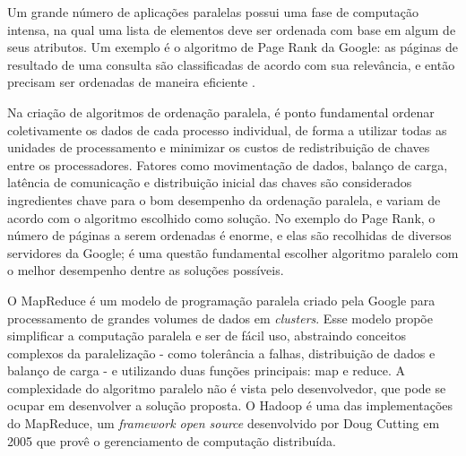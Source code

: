 

Um grande número de aplicações paralelas possui uma fase de computação intensa, na qual uma lista de elementos deve ser ordenada com base em algum de seus atributos. Um exemplo é o algoritmo de Page Rank \cite{PageRank:1999} da Google: as páginas de resultado de uma consulta são classificadas de acordo com sua relevância, e então precisam ser ordenadas de maneira eficiente \cite{Kale:2010}.

Na criação de algoritmos de ordenação paralela, é ponto fundamental ordenar coletivamente os dados de cada processo individual, de forma a utilizar todas as unidades de processamento e minimizar os custos de redistribuição de chaves entre os processadores. Fatores como movimentação de dados, balanço de carga, latência de comunicação e distribuição inicial das chaves são considerados ingredientes chave para o bom desempenho da ordenação paralela, e variam de acordo com o algoritmo escolhido como solução\cite{Kale:2010}. 
No exemplo do Page Rank, o número de páginas a serem ordenadas é enorme, e elas são recolhidas de diversos servidores da Google; é uma questão fundamental escolher algoritmo paralelo com o melhor desempenho dentre as soluções possíveis.


O MapReduce\cite{Dean:2008}  é um modelo de programação paralela criado pela Google para processamento de grandes volumes de dados em \textit{clusters}. Esse modelo propõe simplificar a computação paralela e ser de fácil uso, abstraindo conceitos complexos da paralelização - como tolerância a falhas, distribuição de dados e balanço de carga - e utilizando duas funções principais: map e reduce. A complexidade do algoritmo paralelo não é vista pelo desenvolvedor, que pode se ocupar em desenvolver a solução proposta. O Hadoop \cite{Hadoop:2010} é uma das implementações do MapReduce, um \textit{framework open source } desenvolvido por Doug Cutting em 2005 que provê o gerenciamento de computação distribuída. %

